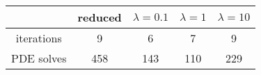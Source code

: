 \begin{tabular}{ccccc}
& reduced & $\lambda = 0.1$ & $\lambda = 1$ & $\lambda = 10$ \\
\hline
iterations & 9 & 6 & 7 & 9 \\
PDE solves & 458 & 143 & 110 & 229 \\
\hline
\end{tabular}

